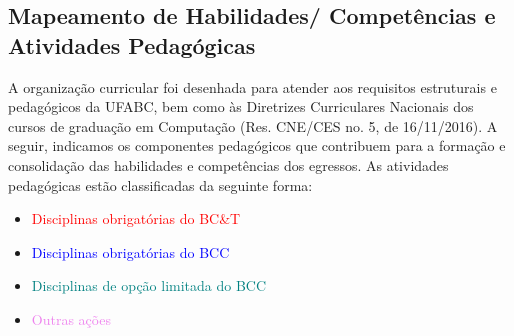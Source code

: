 \documentclass{article}
\begin{document}
\subsection{Mapeamento de Habilidades/ Competências e Atividades Pedagógicas}
A organização curricular foi desenhada para atender aos requisitos estruturais e pedagógicos da UFABC, bem como às Diretrizes Curriculares Nacionais dos cursos de graduação em Computação (Res. CNE/CES no. 5, de 16/11/2016). A seguir, indicamos os componentes pedagógicos que contribuem para a formação e consolidação das habilidades e competências dos egressos. As atividades pedagógicas estão classificadas da seguinte forma:

\begin{itemize}
	\item \textcolor{red}{Disciplinas obrigatórias do BC\&T}
	\item \textcolor{blue}{Disciplinas obrigatórias do BCC}
	\item \textcolor{teal}{Disciplinas de opção limitada do BCC}
	\item \textcolor{violet}{Outras ações}
\end{itemize}


\end{document}
